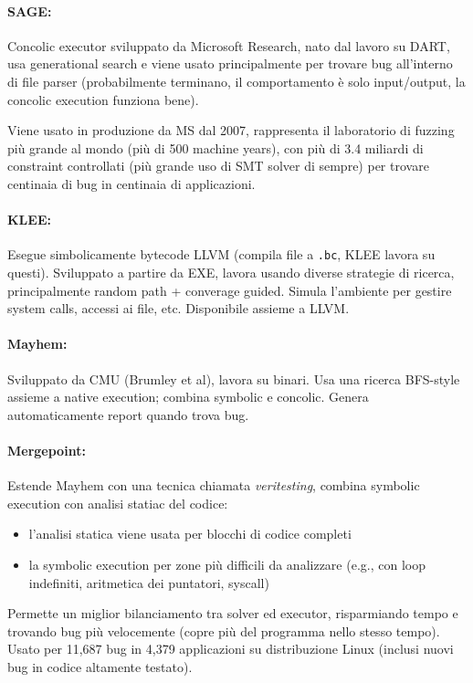 \paragraph{SAGE:} Concolic executor sviluppato da Microsoft Research, nato dal lavoro su DART, usa generational search e viene usato principalmente per trovare bug all'interno di file parser (probabilmente terminano, il comportamento è solo input/output, la concolic execution funziona bene). 

Viene usato in produzione da MS dal 2007, rappresenta il laboratorio di fuzzing più grande al mondo (più di 500 machine years), con più di 3.4 miliardi di constraint controllati (più grande uso di SMT solver di sempre) per trovare centinaia di bug in centinaia di applicazioni.

\paragraph{KLEE:} Esegue simbolicamente bytecode LLVM (compila file a \texttt{.bc}, KLEE lavora su questi). Sviluppato a partire da EXE, lavora usando diverse strategie di ricerca, principalmente random path + converage guided. Simula l'ambiente per gestire system calls, accessi ai file, etc. Disponibile assieme a LLVM.

\paragraph{Mayhem:} Sviluppato da CMU (Brumley et al), lavora su binari. Usa una ricerca BFS-style assieme a native execution; combina symbolic e concolic. Genera automaticamente report quando trova bug.

\paragraph{Mergepoint:} Estende Mayhem con una tecnica chiamata \textit{veritesting}, combina symbolic execution con analisi statiac del codice:
\begin{itemize}
	\item l'analisi statica viene usata per blocchi di codice completi

	\item la symbolic execution per zone più difficili da analizzare (e.g., con loop indefiniti, aritmetica dei puntatori, syscall)
\end{itemize}
Permette un miglior bilanciamento tra solver ed executor, risparmiando tempo e trovando bug più velocemente (copre più del programma nello stesso tempo). Usato per 11,687 bug in 4,379 applicazioni su distribuzione Linux (inclusi nuovi bug in codice altamente testato).

